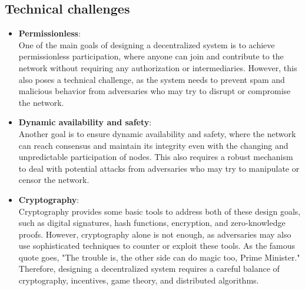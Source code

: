 \subsection*{Technical challenges}
\begin{itemize}
    \item \textbf{Permissionless}:\\
    One of the main goals of designing a decentralized system is to achieve permissionless participation, where anyone can join and contribute to the network without requiring any authorization or intermediaries. However, this also poses a technical challenge, as the system needs to prevent spam and malicious behavior from adversaries who may try to disrupt or compromise the network.
    \item \textbf{Dynamic availability and safety}:\\
    Another goal is to ensure dynamic availability and safety, where the network can reach consensus and maintain its integrity even with the changing and unpredictable participation of nodes. This also requires a robust mechanism to deal with potential attacks from adversaries who may try to manipulate or censor the network.
    \item \textbf{Cryptography}:\\
    Cryptography provides some basic tools to address both of these design goals, such as digital signatures, hash functions, encryption, and zero-knowledge proofs. However, cryptography alone is not enough, as adversaries may also use sophisticated techniques to counter or exploit these tools. As the famous quote goes, "The trouble is, the other side can do magic too, Prime Minister." Therefore, designing a decentralized system requires a careful balance of cryptography, incentives, game theory, and distributed algorithms.
\end{itemize}

